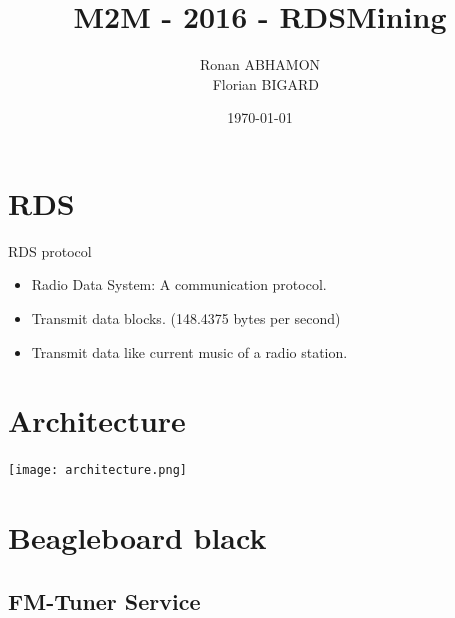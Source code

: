 \documentclass{beamer}
\title{M2M - 2016 - RDSMining}
\author{Ronan ABHAMON \\~ Florian BIGARD}
\institute{Université Joseph Fourier}
\date{\today}
\begin{document}
\begin{frame}
	\titlepage
\end{frame}

\section{RDS}
\begin{frame}
	\begin{block}{RDS protocol}
		\begin{itemize}
			\item Radio Data System: A communication protocol.
			\item Transmit data blocks. (148.4375 bytes per second)
			\item Transmit data like current music of a radio station.
		\end{itemize}		
	\end{block}
\end{frame}

\section{Architecture}
\begin{frame}
	\begin{center}
		\texttt{[image: architecture.png]}
	\end{center}
\end{frame}

\section{Beagleboard black}

\subsection{FM-Tuner Service}
\end{document}
